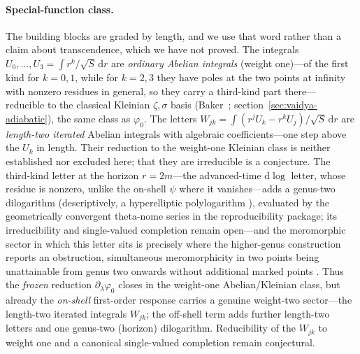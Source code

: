 \documentclass[12pt]{iopart}
\newcommand{\dd}{\mathrm{d}}
\theoremstyle{plain}
\theoremstyle{definition}
\theoremstyle{plain}
\theoremstyle{remark}
\begin{document}
\paragraph{Special-function class.} The building blocks are graded by length, and
we use that word rather than a claim about transcendence, which we have not proved.
The integrals $U_0,\dots,U_3=\int r^k/\sqrt S\,\dd r$ are
\emph{ordinary Abelian integrals} (weight one)---of the first kind for $k=0,1$, while for
$k=2,3$ they have poles at the two points at infinity with nonzero residues in general, so
they carry a third-kind part there--- reducible to the classical Kleinian
$\zeta,\sigma$ basis (Baker~\cite{BakerAbelian1897}; section~\ref{sec:vaidya-adiabatic}),
the same class as $\varphi_0$. The letters
$W_{jk}=\int(r^jU_k-r^kU_j)/\sqrt S\,\dd r$ are \emph{length-two iterated} Abelian
integrals with algebraic coefficients---one step above the $U_k$ in length. Their
reduction to the weight-one Kleinian class is neither established nor excluded here;
that they are irreducible is a conjecture. The third-kind letter at the horizon $r=2m$---the advanced-time
$\dd\log$ letter, whose residue is nonzero, unlike the on-shell $\psi$ where it
vanishes---adds a genus-two dilogarithm (descriptively, a hyperelliptic polylogarithm
\cite{BauneEtal2024,DHokerHiddingSchlotterer2025}), evaluated by the geometrically
convergent theta-nome series in the reproducibility package; its irreducibility and
single-valued completion remain open---and the meromorphic sector in which this
letter sits is precisely where the higher-genus construction reports an obstruction,
simultaneous meromorphicity in two points being unattainable from genus two onwards
without additional marked points
\cite[\S4.5]{DHokerHiddingSchlotterer2025}. Thus the \emph{frozen} reduction
$\partial_\lambda\varphi_0$ closes in the weight-one Abelian/Kleinian class, but already
the \emph{on-shell} first-order response carries a genuine weight-two sector---the
length-two iterated integrals $W_{jk}$; the off-shell term adds further length-two letters
and one genus-two (horizon) dilogarithm. Reducibility of the $W_{jk}$ to weight one and a
canonical single-valued completion remain conjectural.
\end{document}
